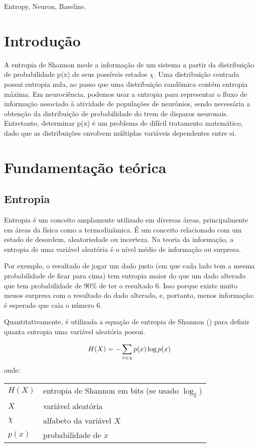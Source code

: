 \documentclass[conference]{IEEEtran}
\makeatletter
\newenvironment{conditions}
  {\par\vspace{\abovedisplayskip}\noindent\begin{tabular}{>{$}l<{$} @{${}={}$} l}}
  {\end{tabular}\par\vspace{\belowdisplayskip}}
\makeatother
\begin{document}
\begin{IEEEkeywords}
  Entropy, Neuron, Baseline.
\end{IEEEkeywords}



\section{Introdução}

A entropia de Shannon mede a informação de um sistema a partir da distribuição de probabilidade p(x) de seus possíveis estados $\chi$. Uma distribuição centrada possui entropia nula, ao passo que uma distribuição randômica contém entropia máxima. Em neurociência, podemos usar a entropia para representar o fluxo de informação associado à atividade de populações de neurônios, sendo necessária a obtenção da distribuição de probabilidade do trem de disparos neuronais. Entretanto, determinar p(x) é um problema de difícil tratamento matemático, dado que as distribuições envolvem múltiplas variáveis dependentes entre si.

\section{Fundamentação teórica}

\subsection{Entropia}

Entropia é um conceito amplamente utilizado em diversas áreas, principalmente em áreas da física como a termodinâmica. É um conceito relacionado com um estado de desordem, aleatoriedade ou incerteza. Na teoria da informação, a entropia de uma variável aleatória é o nível médio de informação ou surpresa.

Por exemplo, o resultado de jogar um dado justo (em que cada lado tem a mesma probabilidade de ficar para cima) tem entropia maior do que um dado alterado que tem probabilidade de 90\% de ter o resultado 6. Isso porque existe muito menos surpresa com o resultado do dado alterado, e, portanto, menos informação: é esperado que caia o número 6.

Quantitativamente, é utilizada a equação de entropia de Shannon () para definir quanta entropia uma variável aleatória possui\cite{shannon}.

\begin{equation}
\label{eqn:shannon}
H(X)  = - \sum_{x \in \chi} p(x) \log p(x) \\
\end{equation}
onde:
\begin{conditions}
H (X) & entropia de Shannon em bits (se usado $\log_2$) \\
X     & variável aleatória \\   
\chi  & alfabeto da variável $X$ \\
p(x)  & probabilidade de $x$
\end{conditions}
\end{document}
